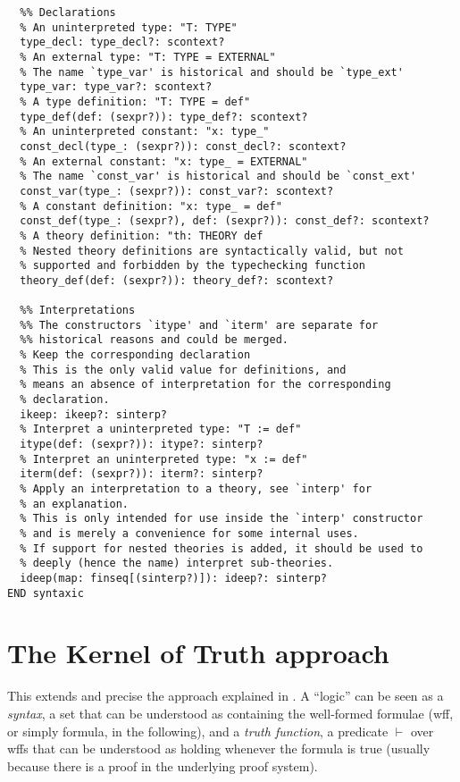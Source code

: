 \documentclass[utf8,a4paper]{article}
\begin{document}
\begin{verbatim}
  %% Declarations
  % An uninterpreted type: "T: TYPE"
  type_decl: type_decl?: scontext?
  % An external type: "T: TYPE = EXTERNAL"
  % The name `type_var' is historical and should be `type_ext'
  type_var: type_var?: scontext?
  % A type definition: "T: TYPE = def"
  type_def(def: (sexpr?)): type_def?: scontext?
  % An uninterpreted constant: "x: type_"
  const_decl(type_: (sexpr?)): const_decl?: scontext?
  % An external constant: "x: type_ = EXTERNAL"
  % The name `const_var' is historical and should be `const_ext'
  const_var(type_: (sexpr?)): const_var?: scontext?
  % A constant definition: "x: type_ = def"
  const_def(type_: (sexpr?), def: (sexpr?)): const_def?: scontext?
  % A theory definition: "th: THEORY def
  % Nested theory definitions are syntactically valid, but not
  % supported and forbidden by the typechecking function
  theory_def(def: (sexpr?)): theory_def?: scontext?

  %% Interpretations
  %% The constructors `itype' and `iterm' are separate for
  %% historical reasons and could be merged.
  % Keep the corresponding declaration
  % This is the only valid value for definitions, and
  % means an absence of interpretation for the corresponding
  % declaration.
  ikeep: ikeep?: sinterp?
  % Interpret a uninterpreted type: "T := def"
  itype(def: (sexpr?)): itype?: sinterp?
  % Interpret an uninterpreted type: "x := def"
  iterm(def: (sexpr?)): iterm?: sinterp?
  % Apply an interpretation to a theory, see `interp' for
  % an explanation.
  % This is only intended for use inside the `interp' constructor
  % and is merely a convenience for some internal uses.
  % If support for nested theories is added, it should be used to
  % deeply (hence the name) interpret sub-theories.
  ideep(map: finseq[(sinterp?)]): ideep?: sinterp?
END syntaxic
\end{verbatim}

\section{The Kernel of Truth approach}
\label{sec:kot}

This extends and precise the approach explained in \cite{RIP10}. A
``logic'' can be seen as a \textit{syntax}, a set that can be
understood as containing the well-formed formulae (wff, or simply
formula, in the following), and a \textit{truth function}, a predicate
$\vdash$ over wffs that can be understood as holding whenever the
formula is true (usually because there is a proof in the underlying
proof system).
\end{document}
